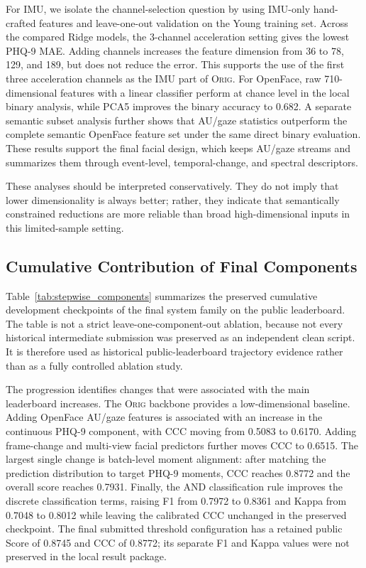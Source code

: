 \documentclass[sigconf,screen,review]{acmart}
\begin{document}
For IMU, we isolate the channel-selection question by using IMU-only
hand-crafted features and leave-one-out validation on the Young training set.
Across the compared Ridge models, the 3-channel acceleration setting gives the
lowest PHQ-9 MAE. Adding channels increases the feature dimension from 36 to
78, 129, and 189, but does not reduce the error. This supports the use of the
first three acceleration channels as the IMU part of \textsc{Orig}. For
OpenFace, raw 710-dimensional features with a linear classifier perform at
chance level in the local binary analysis, while PCA5 improves the binary
accuracy to 0.682. A separate semantic subset analysis further shows that
AU/gaze statistics outperform the complete semantic OpenFace feature set under
the same direct binary evaluation. These results support the final facial
design, which keeps AU/gaze streams and summarizes them through event-level,
temporal-change, and spectral descriptors.



These analyses should be interpreted conservatively. They do not imply that
lower dimensionality is always better; rather, they indicate that semantically
constrained reductions are more reliable than broad high-dimensional inputs in
this limited-sample setting.

\subsection{Cumulative Contribution of Final Components}
\label{sec:exp-components}

Table~\ref{tab:stepwise_components} summarizes the preserved cumulative
development checkpoints of the final system family on the public leaderboard.
The table is not a strict leave-one-component-out ablation, because not every
historical intermediate submission was preserved as an independent clean
script. It is therefore used as historical public-leaderboard trajectory
evidence rather than as a fully controlled ablation study.



The progression identifies changes that were associated with the main
leaderboard increases. The \textsc{Orig} backbone provides a low-dimensional
baseline. Adding OpenFace AU/gaze features is associated with an increase in the
continuous PHQ-9 component, with CCC moving from 0.5083 to 0.6170. Adding
frame-change and multi-view facial predictors further moves CCC to 0.6515. The
largest single change is batch-level moment alignment: after matching the
prediction distribution to target PHQ-9 moments, CCC reaches 0.8772 and the
overall score reaches 0.7931. Finally, the AND classification rule improves the
discrete classification terms, raising F1 from 0.7972 to 0.8361 and Kappa from
0.7048 to 0.8012 while leaving the calibrated CCC unchanged in the preserved
checkpoint. The final submitted threshold configuration has a retained public
Score of 0.8745 and CCC of 0.8772; its separate F1 and Kappa values were not
preserved in the local result package.
\end{document}
